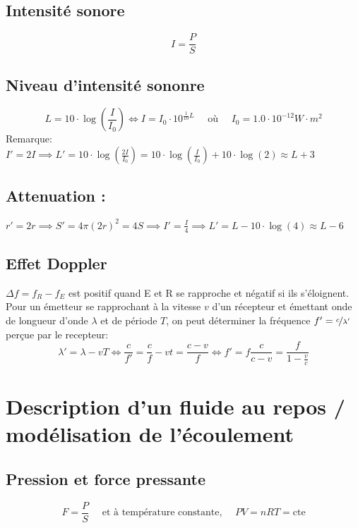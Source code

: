 \documentclass[a5paper,10pt]{article}
\begin{document}
    \subsection{Intensité sonore}
    \vspace{-2em}
    \[
	I=\frac{P}{S}
    \]
    \subsection{Niveau d'intensité sononre }
    \[
	    L=10\cdot\log\left(\frac{I}{I_0}\right) \iff I=I_0\cdot 10^{\frac{1}{10}L}  \quad\text{ où }\quad I_0=1.0\cdot 10^{-12}W\cdot m^2
    \]
    Remarque: $\displaystyle I'=2I \implies L'=10\cdot \log\left(\frac{2I}{I_0}\right) = 10\cdot\log\left(\frac{I}{I_0}\right)+10\cdot\log(2) \approx L+3$
    
    \subsection{Attenuation : }
    $r'=2r \implies S'=4\pi (2r)^2 = 4S \implies I'=\frac{I}{4} \implies L'=L-10\cdot\log(4) \approx L-6$

\vspace{4pt}
    \subsection{Effet Doppler}
    $\displaystyle \Delta f=f_R-f_E$ est positif quand E et R se rapproche et négatif si ils s'éloignent.\\
    Pour un émetteur se rapprochant à la vitesse $v$ d'un récepteur et émettant onde de longueur d'onde $\lambda$ et de période $T$, on peut déterminer la fréquence $f'=\nicefrac{c}{\lambda'}$ perçue par le recepteur:
    \[
      \lambda'=\lambda-vT \iff \frac{c}{f'}=\frac{c}{f}-vt=\frac{c-v}{f} \iff f'=f\frac{c}{c-v}=\frac{f}{1-\frac{v}{c}}
    \]
    
    

    \section{Description d'un fluide au repos / modélisation de l'écoulement}
    \subsection{Pression et force pressante}
    \[
      F=\frac{P}{S} \quad\text{ et à température constante, }\quad PV=nRT=\mathrm{cte}
    \]
\end{document}
